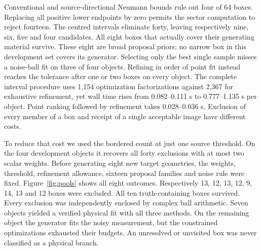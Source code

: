 Conventional and source-directional Neumann bounds rule out four of 64 boxes. Replacing all positive lower endpoints by zero permits the sector computation to reject fourteen. The centred intervals eliminate forty, leaving respectively nine, six, five and four candidates. All eight boxes that actually cover their generating material survive. These eight are broad proposal priors; no narrow box in this development set covers its generator. Selecting only the best single sample misses a noise-ball fit on three of four objects. Refining in order of point fit instead reaches the tolerance after one or two boxes on every object. The complete interval procedure uses 1,154 optimization factorizations against 2,367 for exhaustive refinement, yet wall time rises from 0.082--0.111 s to 0.777--1.135 s per object. Point ranking followed by refinement takes 0.028--0.036 s. Exclusion of every member of a box and receipt of a single acceptable image have different costs.

To reduce that cost we used the bordered count at just one source threshold. On the four development objects it recovers all forty exclusions with at most two scalar weights. Before generating eight new target geometries, the weights, threshold, refinement allowance, sixteen proposal families and noise rule were fixed. Figure~\ref{fig:pools} shows all eight outcomes. Respectively 13, 12, 13, 12, 9, 14, 13 and 12 boxes were excluded. All ten truth-containing boxes survived. Every exclusion was independently enclosed by complex ball arithmetic. Seven objects yielded a verified physical fit with all three methods. On the remaining object the generator fits the noisy measurement, but the constrained optimizations exhausted their budgets. An unresolved or unvisited box was never classified as a physical branch.

